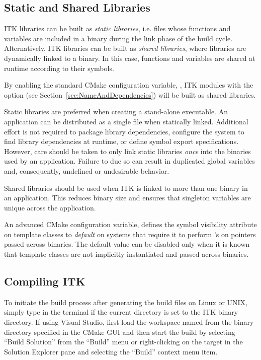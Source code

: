 \subsection{Static and Shared Libraries}%
\label{sec:StaticSharedLibraries}

ITK libraries can be built as \textit{static libraries}, i.e. files whose
functions and variables are included in a binary during the link phase of
the build cycle. Alternatively, ITK libraries can be built as
\textit{shared libraries}, where libraries are dynamically linked to a
binary. In this case, functions and variables are shared at runtime according
to their symbols.

By enabling the standard CMake configuration variable,
, ITK modules with the  option
(see Section~\ref{sec:NameAndDependencies}) will be built as shared libraries.

Static libraries are preferred when creating a stand-alone executable. An
application can be distributed as a single file when statically linked.
Additional effort is not required to package library dependencies, configure the
system to find library dependencies at runtime, or define symbol export
specifications. However, care should be taken to only link static libraries
\textit{once} into the binaries used by an application. Failure to due so can
result in duplicated global variables and, consequently, undefined or
undesirable behavior.

Shared libraries should be used when ITK is linked to more than one binary in
an application. This reduces binary size and ensures that singleton
variables are unique across the application.

An advanced CMake configuration variable,
 defines the symbol visibility
attribute on template classes to \textit{default} on systems that require it
to perform 's on pointers passed across binaries. The
default value can be disabled only when it is known that template classes are
not implicitly instantiated and passed across binaries.


\subsection{Compiling ITK}%
\label{sec:BuildITK}%

To initiate the build process after generating the build files on Linux or UNIX,
simply type  in the terminal if the current directory is set to the
ITK binary directory. If using Visual Studio, first load the workspace named
 from the binary directory specified in the CMake GUI and then
start the build by selecting ``Build Solution'' from the ``Build'' menu
or right-clicking on the  target in the Solution Explorer pane
and selecting the ``Build'' context menu item.

